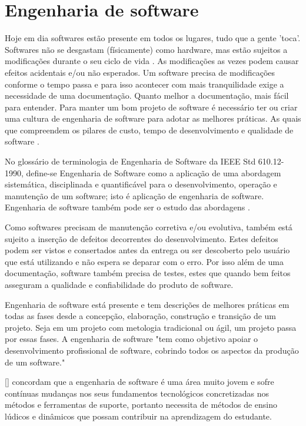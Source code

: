 \section[Engenharia de software]{Engenharia de software}
Hoje em dia softwares estão presente em todos os lugares, tudo que a gente 'toca'. Softwares não se desgastam (físicamente) como hardware, mas estão sujeitos a modificações durante o seu ciclo de vida \cite{Silva_filho}. As modificações as vezes podem causar efeitos acidentais e/ou não esperados. Um software precisa de modificações conforme o tempo passa e para isso acontecer com mais tranquilidade exige a necessidade de uma documentação. Quanto melhor a documentação, mais fácil para entender. Para manter um bom projeto de software é necessário ter ou criar uma cultura de engenharia de software para adotar as melhores práticas. As quais que compreendem os pilares de custo, tempo de desenvolvimento e qualidade de software \cite{Silva_filho}.

No glossário de terminologia de Engenharia de Software da IEEE Std 610.12-1990, define-se Engenharia de Software como a aplicação de uma abordagem sistemática, disciplinada e quantificável para o desenvolvimento, operação e manutenção de um software; isto é aplicação de engenharia de software. Engenharia de software também pode ser o estudo das abordagens \cite{ieeeTerminology}.

Como softwares precisam de manutenção corretiva e/ou evolutiva, também está sujeito a inserção de defeitos decorrentes do desenvolvimento. Estes defeitos podem ser vistos e consertados antes da entrega \cite{Silva_filho} ou ser descoberto pelo usuário que está utilizando e não espera se deparar com o erro. Por isso além de uma documentação, software também precisa de testes, estes que quando bem feitos asseguram a qualidade e confiabilidade do produto de software.

Engenharia de software está presente e tem descrições de melhores práticas em todas as fases desde a concepção, elaboração, construção e transição de um projeto. Seja em um projeto com metologia tradicional ou ágil, um projeto passa por essas fases. A engenharia de software "tem como objetivo apoiar o desenvolvimento profissional de software, cobrindo todos os aspectos da produção de um software."

[\cite{sucessoJogoEngSoft}] \cite{benittiMolleri} concordam que a engenharia de software é uma área muito jovem e sofre contínuas mudanças nos seus fundamentos tecnológicos concretizadas nos métodos e ferramentas de suporte, portanto necessita de métodos de ensino lúdicos e dinâmicos que possam contribuir na aprendizagem do estudante.


